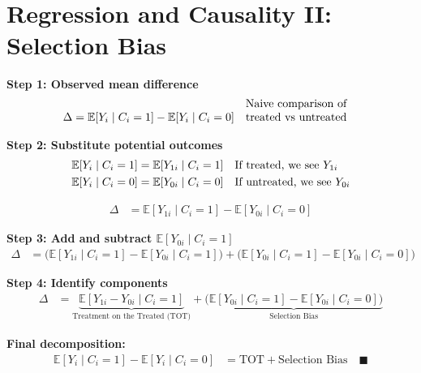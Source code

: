 \documentclass[12pt]{article}
\begin{document}
\section*{\noindent\textbf{Regression and Causality II: Selection Bias}}

\singlespacing
\noindent \textbf{Step 1: Observed mean difference}  
\begin{align}
\Delta &= \mathbb{E}[Y_i \mid C_i=1] - \mathbb{E}[Y_i \mid C_i=0] && \text{\shortstack[l]{Naive comparison of \\ treated vs untreated}}
\end{align}

\vspace{1em}
\noindent \textbf{Step 2: Substitute potential outcomes}  
\begin{align}
\mathbb{E}[Y_i \mid C_i=1] &= \mathbb{E}[Y_{1i} \mid C_i=1] && \text{\shortstack[l]{If treated, we see $Y_{1i}$}} \\
\mathbb{E}[Y_i \mid C_i=0] &= \mathbb{E}[Y_{0i} \mid C_i=0] && \text{\shortstack[l]{If untreated, we see $Y_{0i}$}}
\end{align}

\begin{align}
\Delta &= \mathbb{E}[Y_{1i} \mid C_i=1] - \mathbb{E}[Y_{0i} \mid C_i=0] 
\end{align}

\vspace{1em}
\noindent \textbf{Step 3: Add and subtract $\mathbb{E}[Y_{0i}\mid C_i=1]$}  
\begin{align}
\Delta &= \Big( \mathbb{E}[Y_{1i} \mid C_i=1] - \mathbb{E}[Y_{0i} \mid C_i=1] \Big) 
       + \Big( \mathbb{E}[Y_{0i} \mid C_i=1] - \mathbb{E}[Y_{0i} \mid C_i=0] \Big)
\end{align}

\vspace{1em}
\noindent \textbf{Step 4: Identify components}  
\begin{align}
\Delta &= \underbrace{\mathbb{E}[Y_{1i} - Y_{0i} \mid C_i=1]}_{\text{Treatment on the Treated (TOT)}} 
       + \underbrace{\Big(\mathbb{E}[Y_{0i} \mid C_i=1] - \mathbb{E}[Y_{0i} \mid C_i=0]\Big)}_{\text{Selection Bias}}
\end{align}

\noindent \textbf{Final decomposition:}  
\begin{align}
\mathbb{E}[Y_i \mid C_i=1] - \mathbb{E}[Y_i \mid C_i=0] 
   &= \text{TOT} + \text{Selection Bias} \quad \blacksquare
\end{align}
\end{document}
